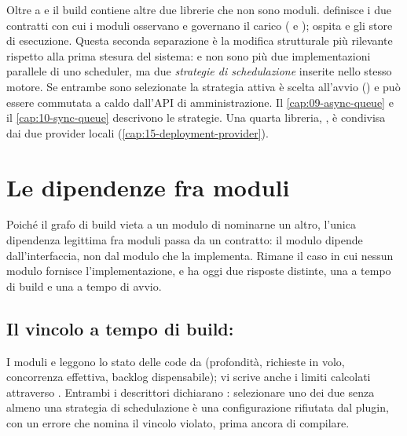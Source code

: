 Oltre a  e  il build contiene altre due
librerie che non sono moduli.  definisce i due contratti
con cui i moduli osservano e governano il carico
( e );
 ospita  e gli store di
esecuzione. Questa seconda separazione \`e la modifica strutturale pi\`u
rilevante rispetto alla prima stesura del sistema:  e
 non sono pi\`u due implementazioni parallele di uno scheduler,
ma due \emph{strategie di schedulazione} inserite nello stesso motore. Se
entrambe sono selezionate la strategia attiva \`e scelta all'avvio
() e pu\`o essere commutata a caldo dall'API di
amministrazione. Il \cref{cap:09-async-queue} e il \cref{cap:10-sync-queue}
descrivono le strategie. Una quarta libreria, ,
\`e condivisa dai due provider locali (\cref{cap:15-deployment-provider}).

\section{Le dipendenze fra moduli}

Poich\'e il grafo di build vieta a un modulo di nominarne un altro, l'unica
dipendenza legittima fra moduli passa da un contratto: il modulo dipende
dall'interfaccia, non dal modulo che la implementa. Rimane il caso in cui
nessun modulo fornisce l'implementazione, e ha oggi due risposte distinte,
una a tempo di build e una a tempo di avvio.

\subsection{Il vincolo a tempo di build: }

I moduli  e  leggono lo stato delle
code da  (profondit\`a, richieste in volo, concorrenza
effettiva, backlog dispensabile);  vi scrive anche i
limiti calcolati attraverso . Entrambi i
descrittori dichiarano :
selezionare uno dei due senza almeno una strategia di schedulazione \`e una
configurazione rifiutata dal plugin, con un errore che nomina il vincolo
violato, prima ancora di compilare.

